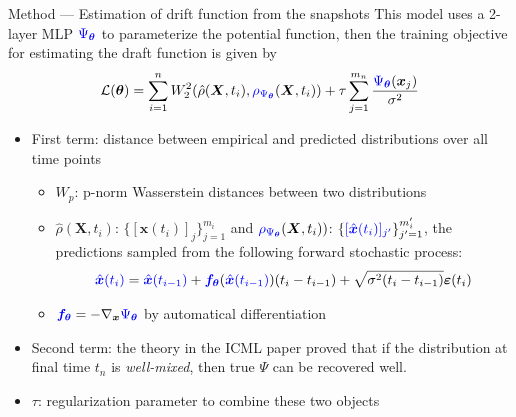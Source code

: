 \documentclass[10pt]{beamer}
\begin{document}
\begin{frame}{Method --- \normalsize Estimation of drift function from the snapshots}
    \small
    This model uses a 2-layer MLP $\textcolor{blue}{\Psi_{\bm{\theta}}}$ to parameterize the potential function,
    then the training objective for estimating the draft function is given by\cite{hashimotoLearningPopulationlevelDiffusions2016}  
    \begin{gather}
        \mathcal{L}(\bm{\theta}) 
        = \sum_{i=1}^n W_2^2(\hat{\rho}(\bm{X},t_i),\textcolor{blue}{\rho_{\Psi_{\bm{\theta}}}}(\bm{X},t_i))
        + \tau\sum_{j=1}^{m_n}\frac{\textcolor{blue}{\Psi_{\bm{\theta}}}(\bm{x}_j)}{\sigma^2}
    \end{gather}

    \begin{itemize}
        \item First term: distance between empirical and predicted distributions over all time points
        \begin{itemize}
            \item $W_p$: p-norm Wasserstein distances between two distributions
            \item $\hat{\rho}(\bm{X},t_i)$: $\{[\bm{x}(t_i)]_j\}_{j=1}^{m_i}$ and $\textcolor{blue}{\rho_{\Psi_{\bm{\theta}}}}(\bm{X},t_i))$: $\{\textcolor{blue}{[\hat{\bm{x}}(t_i)]_{j'}}\}_{j'=1}^{m'_i}$, the predictions sampled from the following forward stochastic process:
            {\small\begin{gather*}
                \textcolor{blue}{\hat{\bm{x}}(t_i)} = \textcolor{blue}{\hat{\bm{x}}(t_{i-1})} + \textcolor{blue}{\bm{f}_{\bm{\theta}}}(\textcolor{blue}{\hat{\bm{x}}(t_{i-1})})(t_i-t_{i-1}) + \sqrt{\sigma^2(t_i-t_{i-1})} \bm{\varepsilon}(t_i)
            \end{gather*}}
            \item $\textcolor{blue}{\bm{f}_{\bm{\theta}}} = - \nabla_{\bm{x}}\textcolor{blue}{\Psi_{\bm{\theta}}}$ by automatical differentiation
        \end{itemize}
        
        \item Second term: the theory in the ICML paper\cite{hashimotoLearningPopulationlevelDiffusions2016} proved that if the distribution at final time $t_n$ is \textit{well-mixed}, then true $\Psi$ can be recovered well. 
        \item $\tau$: regularization parameter to combine these two objects
    \end{itemize}

\end{frame}
\end{document}
